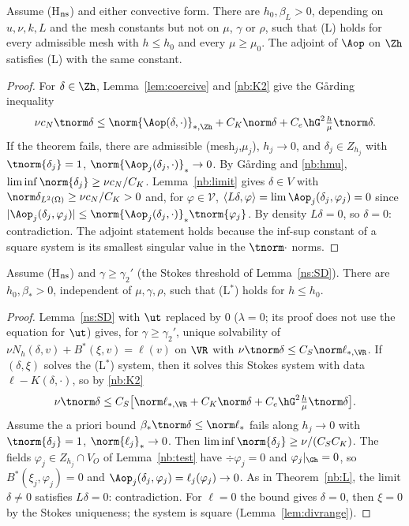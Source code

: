 \begin{theorem}\label{nb:L}
Assume (H$_{\rm ns}$) and either convective form. There are $h_0,\beta_L>0$, depending on $u,\nu,k,L$ and the mesh constants but not on $\mu$, $\gamma$ or $\rho$, such that
(L) holds for every admissible mesh with $h\le h_0$ and every $\mu\ge\mu_0$. The adjoint of $\Aop$ on $\Zh$ satisfies (L) with the same constant.
\end{theorem}
\begin{proof}
For $\delta\in\Zh$, Lemma~\ref{lem:coercive} and \eqref{nb:K2} give the G\aa rding inequality
\[
\nu c_N\tnorm\delta\le\norm{\Aop(\delta,\cdot)}_{\ast,\Zh}+C_K\norm\delta+C_e\hG^2\tfrac h\mu\tnorm\delta .
\]
If the theorem fails, there are admissible (mesh$_j$,$\mu_j$), $h_j\to0$, and $\delta_j\in Z_{h_j}$ with $\tnorm{\delta_j}=1$, $\norm{\Aop_j(\delta_j,\cdot)}_\ast\to0$. By G\aa rding and \eqref{nb:hmu},
$\liminf\norm{\delta_j}\ge\nu c_N/C_K$. Lemma~\ref{nb:limit} gives $\delta\in V$ with $\norm\delta_{L^2(\Omega)}\ge\nu c_N/C_K>0$ and, for $\varphi\in\mathcal V$,
$\langle L\delta,\varphi\rangle=\lim\Aop_j(\delta_j,\varphi_j)=0$ since $|\Aop_j(\delta_j,\varphi_j)|\le\norm{\Aop_j(\delta_j,\cdot)}_\ast\tnorm{\varphi_j}$. By density $L\delta=0$, so $\delta=0$: contradiction.
The adjoint statement holds because the inf-sup constant of a square system is its smallest singular value in the $\tnorm\cdot$ norms.
\end{proof}

\begin{theorem}\label{nb:Lstar}
Assume (H$_{\rm ns}$) and $\gamma\ge\gamma_2'$ (the Stokes threshold of Lemma~\ref{ns:SD}). There are $h_0,\beta_\ast>0$, independent of $\mu,\gamma,\rho$, such that (L$^\ast$) holds for $h\le h_0$.
\end{theorem}
\begin{proof}
Lemma~\ref{ns:SD} with $\ut$ replaced by $0$ ($\lambda=0$; its proof does not use the equation for $\ut$) gives, for $\gamma\ge\gamma_2'$, unique solvability of
$\nu N_h(\delta,v)+B^\ast(\xi,v)=\ell(v)$ on $\VR$ with $\nu\tnorm\delta\le C_S\norm\ell_{\ast,\VR}$. If $(\delta,\xi)$ solves the (L$^\ast$) system, then it solves this Stokes system with data $\ell-K(\delta,\cdot)$, so by \eqref{nb:K2}
\[
\nu\tnorm\delta\le C_S\bigl[\norm\ell_{\ast,\VR}+C_K\norm\delta+C_e\hG^2\tfrac h\mu\tnorm\delta\bigr].
\]
Assume the a priori bound $\beta_\ast\tnorm\delta\le\norm\ell_\ast$ fails along $h_j\to0$ with $\tnorm{\delta_j}=1$, $\norm{\ell_j}_\ast\to0$. Then $\liminf\norm{\delta_j}\ge\nu/(C_SC_K)$.
The fields $\varphi_j\in Z_{h_j}\cap V_{O}$ of Lemma~\ref{nb:test} have $\div\varphi_j=0$ and $\varphi_j|_{\Gh}=0$, so $B^\ast(\xi_j,\varphi_j)=0$ and $\Aop_j(\delta_j,\varphi_j)=\ell_j(\varphi_j)\to0$.
As in Theorem~\ref{nb:L}, the limit $\delta\ne0$ satisfies $L\delta=0$: contradiction. For $\ell=0$ the bound gives $\delta=0$, then $\xi=0$ by the Stokes uniqueness; the system is square (Lemma~\ref{lem:divrange}).
\end{proof}

